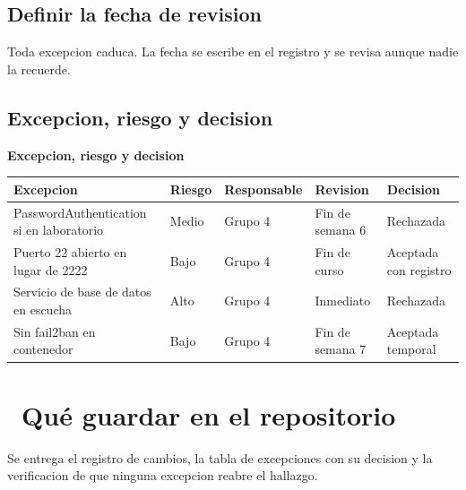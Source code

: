 \documentclass[11pt,a4paper]{article}
\newcommand{\iconotexto}[2]{\textcolor{cyanNeon}{\faIcon{#1}}~#2}
\begin{document}
\subsection{Definir la fecha de revision}

Toda excepcion caduca. La fecha se escribe en el registro y se revisa aunque nadie la recuerde.

\subsection{Excepcion, riesgo y decision}

\begin{center}
\begin{minipage}{\linewidth}
\centering
{\footnotesize
\textbf{Excepcion, riesgo y decision}\par\smallskip
\begin{tabular}{@{}>{\raggedright\arraybackslash}p{3.20cm}>{\raggedright\arraybackslash}p{2.00cm}>{\raggedright\arraybackslash}p{2.40cm}>{\raggedright\arraybackslash}p{2.20cm}>{\raggedright\arraybackslash}p{3.40cm}@{}}
\toprule
\textbf{Excepcion} & \textbf{Riesgo} & \textbf{Responsable} & \textbf{Revision} & \textbf{Decision} \\
\midrule
PasswordAuthentication si en laboratorio & Medio & Grupo 4 & Fin de semana 6 & Rechazada \\
Puerto 22 abierto en lugar de 2222 & Bajo & Grupo 4 & Fin de curso & Aceptada con registro \\
Servicio de base de datos en escucha & Alto & Grupo 4 & Inmediato & Rechazada \\
Sin fail2ban en contenedor & Bajo & Grupo 4 & Fin de semana 7 & Aceptada temporal \\
\bottomrule
\end{tabular}
}
\par{}
\end{minipage}
\end{center}

\section{\iconotexto{box-open}{Qué guardar en el repositorio}}

Se entrega el registro de cambios, la tabla de excepciones con su decision y la verificacion de que ninguna excepcion reabre el hallazgo.
\end{document}
